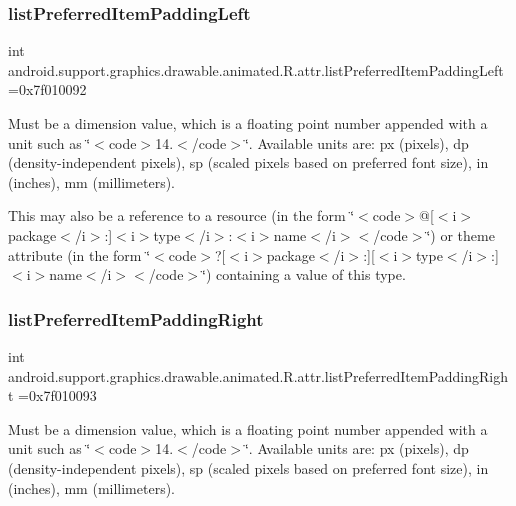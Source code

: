 \subsubsection{\texorpdfstring{list\+Preferred\+Item\+Padding\+Left}{listPreferredItemPaddingLeft}}
{\footnotesize\ttfamily int android.\+support.\+graphics.\+drawable.\+animated.\+R.\+attr.\+list\+Preferred\+Item\+Padding\+Left =0x7f010092\hspace{0.3cm}{\ttfamily [static]}}

Must be a dimension value, which is a floating point number appended with a unit such as \char`\"{}$<$code$>$14.\+5sp$<$/code$>$\char`\"{}. Available units are\+: px (pixels), dp (density-\/independent pixels), sp (scaled pixels based on preferred font size), in (inches), mm (millimeters). 

This may also be a reference to a resource (in the form \char`\"{}$<$code$>$@\mbox{[}$<$i$>$package$<$/i$>$\+:\mbox{]}$<$i$>$type$<$/i$>$\+:$<$i$>$name$<$/i$>$$<$/code$>$\char`\"{}) or theme attribute (in the form \char`\"{}$<$code$>$?\mbox{[}$<$i$>$package$<$/i$>$\+:\mbox{]}\mbox{[}$<$i$>$type$<$/i$>$\+:\mbox{]}$<$i$>$name$<$/i$>$$<$/code$>$\char`\"{}) containing a value of this type. \mbox{\label{classandroid_1_1support_1_1graphics_1_1drawable_1_1animated_1_1R_1_1attr_a2bf904598c883dfdb29e7bd825fd7401}} 
\subsubsection{\texorpdfstring{list\+Preferred\+Item\+Padding\+Right}{listPreferredItemPaddingRight}}
{\footnotesize\ttfamily int android.\+support.\+graphics.\+drawable.\+animated.\+R.\+attr.\+list\+Preferred\+Item\+Padding\+Right =0x7f010093\hspace{0.3cm}{\ttfamily [static]}}

Must be a dimension value, which is a floating point number appended with a unit such as \char`\"{}$<$code$>$14.\+5sp$<$/code$>$\char`\"{}. Available units are\+: px (pixels), dp (density-\/independent pixels), sp (scaled pixels based on preferred font size), in (inches), mm (millimeters). 

